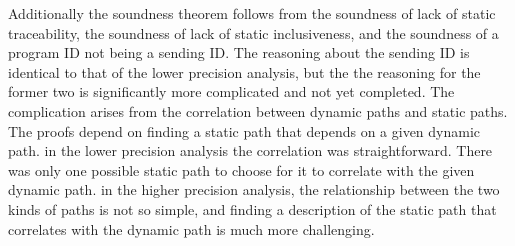 \documentclass{article}
\begin{document}
Additionally the soundness theorem follows from the soundness of lack of static traceability,
the soundness of lack of static inclusiveness,
and the soundness of a program ID not being a sending ID. 
The reasoning about the sending ID is identical to that of the lower precision analysis, but
the the reasoning for the former two is significantly more complicated and not yet completed.
The complication arises from the
correlation between dynamic paths and static paths.  The proofs depend on finding a static 
path that depends on a given dynamic path. in the lower precision analysis the
correlation was straightforward. There was only one possible static path to choose for it
to correlate with the given dynamic path. in the higher precision analysis, the relationship
between the two kinds of paths is not so simple, and finding a description of the static path
that correlates with the dynamic path is much more challenging.
\end{document}
